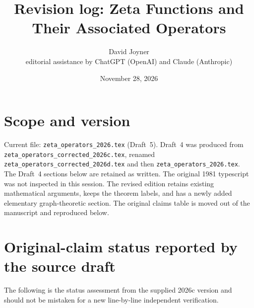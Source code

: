 \documentclass[12pt,letterpaper]{article}
\title{Revision log: Zeta Functions and Their Associated Operators}
\author{David Joyner\\\normalsize editorial assistance by ChatGPT (OpenAI) and Claude (Anthropic)}
\date{November 28, 2026}
\begin{document}
\maketitle
\section{Scope and version}
Current file: \nolinkurl{zeta_operators_2026.tex} (Draft~5).
Draft~4 was produced from \nolinkurl{zeta_operators_corrected_2026c.tex},
renamed \nolinkurl{zeta_operators_corrected_2026d.tex} and then
\nolinkurl{zeta_operators_2026.tex}.  The Draft~4 sections below are
retained as written.
The original 1981 typescript was not inspected in this session.
The revised edition retains existing mathematical arguments,
keeps the theorem labels, and has a newly added elementary
graph-theoretic section. The original claims table is moved
out of the manuscript and reproduced below.

\section{Original-claim status reported by the source draft}
The following is the status assessment from the supplied 2026c
version and should not be mistaken for a new line-by-line
independent verification.
\end{document}
